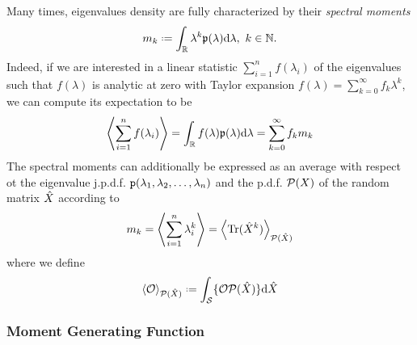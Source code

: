 Many times, eigenvalues density are fully characterized by their \textit{spectral moments} 
\begin{equation}
	\me_k \deff \int_{\R} \lambda^k \pe(\lambda) \dd \lambda, \ k \in \N.
\end{equation} 
Indeed, if we are interested in a linear statistic $\sum_{i=1}^{n} f(\lambda_i)$ of the eigenvalues such that $f(\lambda)$ is analytic at zero with Taylor expansion $f(\lambda) = \sum_{k=0}^{\infty} f_k \lambda^k$, we can compute its expectation to be
\begin{equation}
	\left\langle \sum_{i=1}^{n} f(\lambda_i) \right\rangle = \int_{\mathbb{R}} f(\lambda) \mathfrak{p}(\lambda) \mathrm{d} \lambda = \sum_{k=0}^{\infty} f_k m_k
\end{equation}
The spectral moments can additionally be expressed as an average with respect ot the eigenvalue j.p.d.f. $\mathtt{p}(\lambda_1, \lambda_2, \dots, \lambda_n)$ and the p.d.f. $\mathcal{P}(X)$ of the random matrix $\hat X$ according to
\begin{equation}
	m_k = \left\langle \sum_{i=1}^{n} \lambda_i^k \right\rangle = \left\langle \operatorname{Tr}(\hat X^k) \right\rangle_{\mathcal{P}(\hat X)}
\end{equation}
where we define
\begin{equation}
\left\langle \mathcal{O} \right\rangle_{\eP(\m{X})} \deff \int_{\eS} \{\mathcal{O} \eP(\m{X})\} \dd \m{X}
\end{equation}

\subsubsection{Moment Generating Function}

